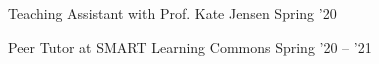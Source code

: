 

\begin{cvhonors}
\cvhonor
{}
{Teaching Assistant with Prof. Kate Jensen}
{}
{Spring '20}
\end{cvhonors}


\begin{cvhonors}
\cvhonor
{}
{Peer Tutor at SMART Learning Commons}
{}
{Spring '20 -- '21}
\end{cvhonors}
\hfill\begin{minipage}{\textwidth-2.1cm}
\doublespacing
{\cvparagraph

}
\end{minipage}






